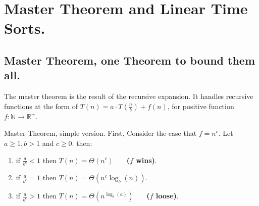 


\ifdefined\BOOK
\else
\setcounter{chapter}{2}
\fi

\chapter{Master Theorem and Linear Time Sorts.} 

\section{Master Theorem, one Theorem to bound them all. }
The master theorem is the result of the recursive expansion. It handles recursive functions at the form of \(T\left(n\right) = a\cdot T\left( \frac{n}{b} \right) + f\left(n\right) \), for positive function \(f : \mathbb{N} \rightarrow \mathbb{R}^{+} \).       

\begin{defbox}{Master Theorem, simple version.} First, Consider the case that \(f = n^c\). Let \( a \ge 1, b > 1\) and \( c \ge 0 \). then: 
\begin{enumerate}
    \item if \(\frac{a}{b^c} < 1 \) then \( T\left(n\right) = \Theta \left( n^c \right) \) \ \ \ \textbf{(\(f\) wins)}.
    \item if \(\frac{a}{b^c} = 1 \) then \( T\left(n\right) = \Theta \left( n^c \log_{b} \left(n\right) \right) \).
    \item if \(\frac{a}{b^c} > 1 \) then \( T\left(n\right) = \Theta \left( n^{\log_{b} \left(a\right)} \right) \) \ \ \ \textbf{(\(f\) loose)}.
  \end{enumerate}
\end{defbox}

